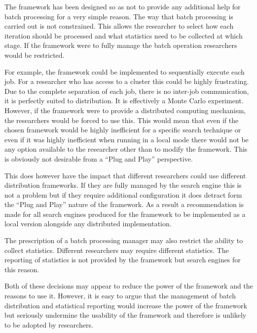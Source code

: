 The framework has been designed so as not to provide any additional help for batch processing for a very simple reason.
The way that batch processing is carried out is not constrained.
This allows the researcher to select how each iteration should be processed and what statistics need to be collected at which stage.
If the framework were to fully manage the batch operation researchers would be restricted.

For example, the framework could be implemented to sequentially execute each job.
For a researcher who has access to a cluster this could be highly frustrating.
Due to the complete separation of each job, there is no inter-job communication, it is perfectly suited to distribution.
It is effectively a Monte Carlo experiment.
However, if the framework were to provide a distributed computing mechanism, the researchers would be forced to use this.
This would mean that even if the chosen framework would be highly inefficient for a specific search technique or even if it was highly inefficient when running in a local mode there would not be any option available to the researcher other than to modify the framework.
This is obviously not desirable from a ``Plug and Play'' perspective.

This does however have the impact that different researchers could use different distribution frameworks.
If they are fully managed by the search engine this is not a problem but if they require additional configuration it does detract form the ``Plug and Play'' nature of the framework.
As a result a recommendation is made for all search engines produced for the framework to be implemented as a local version alongside any distributed implementation.

The prescription of a batch processing manager may also restrict the ability to collect statistics.
Different researchers may require different statistics.
The reporting of statistics is not provided by the framework but search engines for this reason.

Both of these decisions may appear to reduce the power of the framework and the reasons to use it.
However, it is easy to argue that the management of batch distribution and statistical reporting would increase the power of the framework but seriously undermine the usability of the framework and therefore is unlikely to be adopted by researchers.

